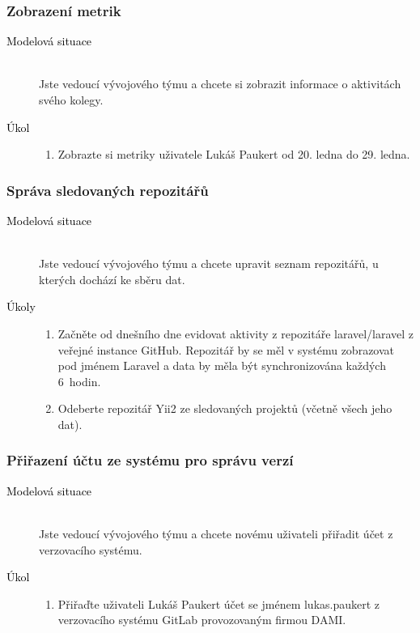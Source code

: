 \subsubsection{Zobrazení metrik}
\begin{description}
    \item[\textcolor{black}{Modelová situace}] \hfill \\
        Jste vedoucí vývojového týmu a chcete si zobrazit informace o aktivitách svého kolegy.
    \item[\textcolor{black}{Úkol}] \hfill
        \vspace{-2mm}
        \begin{enumerate}
            \item Zobrazte si metriky uživatele Lukáš Paukert od 20. ledna do 29. ledna.
        \end{enumerate}
\end{description}

\subsubsection{Správa sledovaných repozitářů}
\begin{description}
    \item[\textcolor{black}{Modelová situace}] \hfill \\
        Jste vedoucí vývojového týmu a chcete upravit seznam repozitářů, u kterých dochází ke sběru dat.
    \item[\textcolor{black}{Úkoly}] \hfill
        \vspace{-2mm}
        \begin{enumerate}
            \item Začněte od dnešního dne evidovat aktivity z repozitáře laravel/laravel z veřejné instance GitHub. Repozitář by se měl v systému zobrazovat pod jménem Laravel a data by měla být synchronizována každých 6~hodin.
            \item Odeberte repozitář Yii2 ze sledovaných projektů (včetně všech jeho dat).
        \end{enumerate}
\end{description}

\subsubsection{Přiřazení účtu ze systému pro správu verzí}
\begin{description}
    \item[\textcolor{black}{Modelová situace}] \hfill \\
        Jste vedoucí vývojového týmu a chcete novému uživateli přiřadit účet z verzovacího systému.
    \item[\textcolor{black}{Úkol}] \hfill
        \vspace{-2mm}
        \begin{enumerate}
            \item Přiřaďte uživateli Lukáš Paukert účet se jménem lukas.paukert z verzovacího systému GitLab provozovaným firmou DAMI.
        \end{enumerate}
\end{description}

